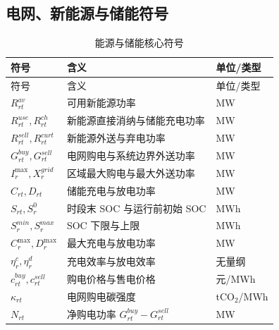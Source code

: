 \subsection{电网、新能源与储能符号}
\begin{longtable}{p{}p{}p{}}
\caption{能源与储能核心符号}\label{tab:symbol-energy}\\
\toprule 符号 & 含义 & 单位/类型\\ \midrule\endfirsthead
\toprule 符号 & 含义 & 单位/类型\\ \midrule\endhead
\bottomrule\endfoot
$R_{rt}^{av}$ & 可用新能源功率 & MW\\
$R_{rt}^{use},R_{rt}^{ch}$ & 新能源直接消纳与储能充电功率 & MW\\
$R_{rt}^{sell},R_{rt}^{curt}$ & 新能源外送与弃电功率 & MW\\
$G_{rt}^{buy},G_{rt}^{sell}$ & 电网购电与系统边界外送功率 & MW\\
$I_r^{\max},X_r^{grid}$ & 区域最大购电与最大外送功率 & MW\\
$C_{rt},D_{rt}$ & 储能充电与放电功率 & MW\\
$S_{rt},S_r^0$ & 时段末 SOC 与运行前初始 SOC & MWh\\
$S_r^{min},S_r^{max}$ & SOC 下限与上限 & MWh\\
$C_r^{\max},D_r^{\max}$ & 最大充电与放电功率 & MW\\
$\eta_r^c,\eta_r^d$ & 充电效率与放电效率 & 无量纲\\
$c_{rt}^{buy},c_{rt}^{sell}$ & 购电价格与售电价格 & 元/MWh\\
$\kappa_{rt}$ & 电网购电碳强度 & tCO$_2$/MWh\\
$N_{rt}$ & 净购电功率 $G_{rt}^{buy}-G_{rt}^{sell}$ & MW\\
\end{longtable}

